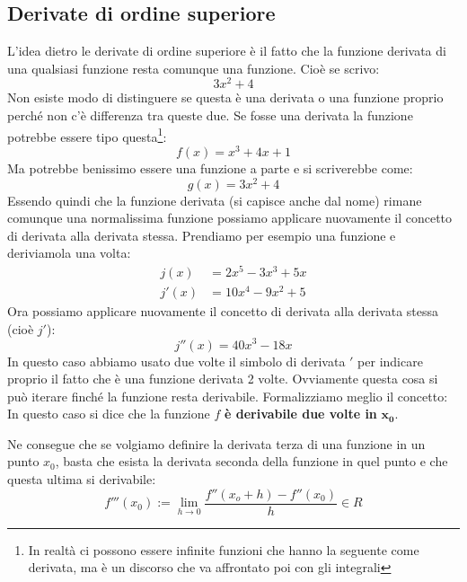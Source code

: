 \subsection{Derivate di ordine superiore}
L'idea dietro le derivate di ordine superiore è il fatto che la funzione derivata di una qualsiasi funzione resta comunque una funzione. Cioè se scrivo:
\begin{equation*}
	3x^2 + 4
\end{equation*}
Non esiste modo di distinguere se questa è una derivata o una funzione proprio perché non c'è differenza tra queste due. Se fosse una derivata la funzione potrebbe essere tipo questa\footnote{In realtà ci possono essere infinite funzioni che hanno la seguente come derivata, ma è un discorso che va affrontato poi con gli integrali}:
\begin{equation*}
	f(x) = x^3 + 4x + 1
\end{equation*}
Ma potrebbe benissimo essere una funzione a parte e si scriverebbe come:
\begin{equation*}
	g(x) = 3x^2 + 4
\end{equation*}
Essendo quindi che la funzione derivata (si capisce anche dal nome) rimane comunque una normalissima funzione possiamo applicare nuovamente il concetto di derivata alla derivata stessa. Prendiamo per esempio una funzione e deriviamola una volta:
\begin{align*}
	j(x) &= 2x^5 - 3x^3 + 5x\\
	j'(x) &= 10x^4 - 9x^2 +5
\end{align*}
Ora possiamo applicare nuovamente il concetto di derivata alla derivata stessa (cioè $j'$):
\begin{equation*}
	j''(x) = 40x^3 - 18x
\end{equation*}
In questo caso abbiamo usato due volte il simbolo di derivata $'$ per indicare proprio il fatto che è una funzione derivata 2 volte. Ovviamente questa cosa si può iterare finché la funzione resta derivabile. Formalizziamo meglio il concetto:
In questo caso si dice che la funzione $f$ \textbf{è derivabile due volte in} $\mathbf{x_0}$.

Ne consegue che se volgiamo definire la derivata terza di una funzione in un punto $x_0$, basta che esista la derivata seconda della funzione in quel punto e che questa ultima si derivabile:
\begin{equation*}
		f'''(x_0) := \lim_{h \to 0} \dfrac{f''(x_o + h) - f''(x_0)}{h} \in R
\end{equation*}

